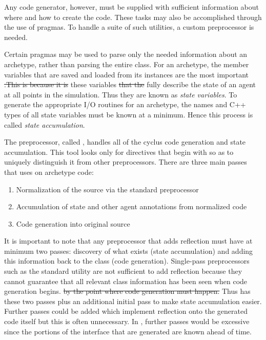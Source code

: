 Any code generator, however, must be supplied with sufficient information about
where and how to create the code. These tasks may also be accomplished through 
the use of pragmas. To handle a suite of such utilities, a custom preprocessor
is needed.

Certain pragmas may be used to parse only the needed information 
about an archetype, rather than parsing the entire class. For an archetype, the 
member variables that are saved and loaded from its instances are the most important \sout{.This is because it is}  these variables \sout{that the} fully describe the state of an agent 
at all points in the simulation. Thus they are known as \emph{state variables}. 
To generate the appropriate I/O routines for an archetype, the names and C++ types 
of all state variables must be known at a minimum. Hence this process is 
called \emph{state accumulation}. 


The \cyclus preprocessor, called \cycpp, handles all of the cyclus code generation
and state accumulation. This tool looks only for directives that begin with  so as to uniquely distinguish it from other preprocessors.
There are three main passes that \cycpp uses on archetype code:
\begin{enumerate}
    \item Normalization of the source via the standard preprocessor  
    \item Accumulation of state and other agent annotations from normalized code 
    \item Code generation into original source
\end{enumerate}
It is important to note that any preprocessor that adds reflection must have at
minimum two passes: discovery of what exists (state accumulation) and adding this
information back to the class (code generation). Single-pass preprocessors such 
as the standard  utility are not sufficient to add reflection because they 
cannot guarantee that all relevant class information has been seen when code generation begins. \sout{by the point 
where code generation must happen.} Thus \cycpp has these two passes plus an additional 
initial pass to make state accumulation easier. Further passes could be added which 
implement reflection onto the generated code itself but this is often unnecessary. 
In \cyclus, further passes would be excessive since the portions of the 
 interface that are generated are known ahead of time.

